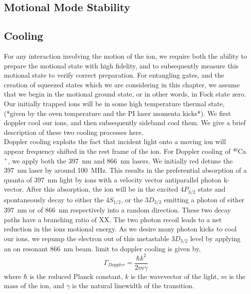 \documentclass[12pt]{report}
\begin{document}
\subsection{Motional Mode Stability}

\subsection{Cooling}
\label{sec:Cooling}
    For any interaction involving the motion of the ion, we require both the
    ability to prepare the motional state with high fidelity, and to
    subsequently measure this motional state to verify correct preparation. For
    entangling gates, and the creation of squeezed states which we are
    considering in this chapter, we assume that we begin in the motional ground
    state, or in other words, in Fock state zero.
    Our initially trapped ions will be in some high temperature thermal state,
    (*given by the oven temperature and the PI laser momenta kicks*). We first
    doppler cool our ions, and then subsequently sideband cool them. We give a brief description of these two cooling processes here.\\
    Doppler cooling exploits the fact that incident light onto a moving ion will appear frequency shifted in the rest frame of the
    ion. For Doppler cooling of $^40$Ca$^+$, we apply both the 397~nm and 866~nm lasers. We initially red detune the 397~nm laser by around 100~MHz. This results in the preferential absorption of a quanta of 397~nm light by ions with a velocity vector antiparallel photon k-vector. After this absorption, the ion will be in the excited $4P_{3/2}$ state and spontaneously decay to either the $4S_{1/2}$, or the $3D_{3/2}$ emitting a photon of either 397~nm or of 866~nm respectively into a random direction. These two decay paths have a branching ratio of XX. The two photon recoil leads to a net reduction in the ions motional energy. As we desire many photon kicks to cool our ions, we repump the electron out of this metastable $3D_{3/2}$ level by applying an on resonant 866~nm beam. 
    limit to doppler cooling is given by,
    \begin{equation}
    \Gamma_{Doppler} =
        \frac{\hbar k^2}{2 m \gamma}
    \end{equation}
    where $\hbar$ is the reduced Planck constant, $k$ is the wavevector of the
    light, $m$ is the mass of the ion, and $\gamma$ is the natural linewidth of the transition.
    
\end{document}
